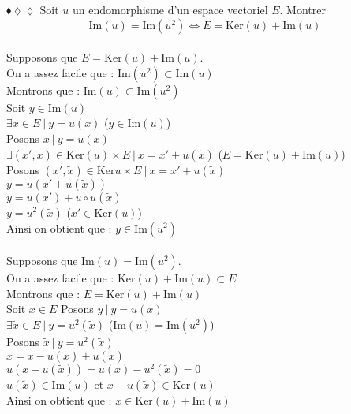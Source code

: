 \documentclass[11pt]{article}
\renewcommand*{\ker}{\textrm{Ker}}
\renewcommand{\Im}{\textrm{Im}}
\begin{document}
\begin{exercise}{$\blacklozenge\lozenge\lozenge$}{}
    Soit $u$ un endomorphisme d'un espace vectoriel $E$. Montrer
    \begin{equation*}
        \Im{(u)} = \Im{(u^{2})} \iff E = \ker{(u)} + \Im{(u)}
    \end{equation*}
    \tcblower\\[0.2cm]
    \fbox{$\Leftarrow$} Supposons que $E = \ker{(u)} + \Im{(u)}$.\\
    On a assez facile que : $\Im{(u^{2})} \subset \Im{(u)}$\\
    Montrons que : $\Im{(u)} \subset \Im{(u^{2})}$\\
    Soit $y \in \Im{(u)}$\\
    $\exists x \in E ~|~ y = u{(x)}$ ($y \in \Im{(u)}$)\\
    Posons $x ~|~ y = u{(x)}$\\
    $\exists (x', \widetilde{x}) \in \ker{(u)} \times E ~|~ x = x' + u{(\widetilde{x})}$ ($E = \ker{(u)} + \Im{(u)}$)\\
    Posons $(x', \widetilde{x}) \in \ker{u} \times E ~|~ x = x' + u{(\widetilde{x})}$\\
    $y = u{(x' + u{(\widetilde{x})})}$\\
    $y = u{(x')} + u \circ u{(\widetilde{x})}$\\
    $y = u^{2}{(\widetilde{x})}$ ($x' \in \ker{(u)}$)\\
    Ainsi on obtient que : $y \in \Im{(u^{2})}$\\\\
    \fbox{$\Rightarrow$} Supposons que $\Im{(u)} = \Im{(u^{2})}$.\\
    On a assez facile que : $\ker{(u)} + \Im{(u)} \subset E$\\
    Montrons que : $E = \ker{(u)} + \Im{(u)}$\\
    Soit $x \in E$
    Posons $y ~|~ y = u{(x)}$\\
    $\exists \widetilde{x} \in E ~|~ y = u^{2}{(\widetilde{x})}$ ($\Im{(u)} = \Im{(u^{2})}$)\\
    Posons $\widetilde{x} ~|~ y = u^{2}{(\widetilde{x})}$\\
    $x = x - u{(\widetilde{x})} + u{(\widetilde{x})}$\\
    $u{(x - u{(\widetilde{x})})} = u{(x)} - u^{2}{(\widetilde{x})} = 0$\\
    $u{(\widetilde{x})} \in \Im{(u)}$ et $x - u{(\widetilde{x})} \in \ker{(u)}$\\
    Ainsi on obtient que : $x \in \ker{(u)} + \Im{(u)}$
\end{exercise}
\end{document}
